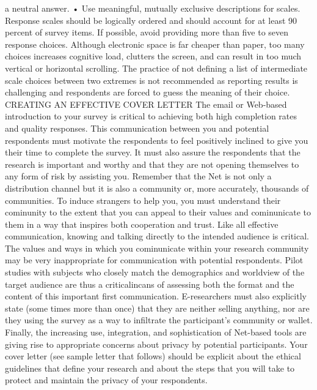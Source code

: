 \documentclass[a4 paper,12pt]{article}
\begin{document}
a neutral answer. 
• Use meaningful, mutually exclusive descriptions for scales. Response scales should be 
logically ordered and should account for at least 90 percent of survey items. If possible, avoid providing more than five to seven response choices. Although electronic space is far cheaper than paper, too many choices increases cognitive load, clutters the screen, and can result in too much vertical or horizontal scrolling. The practice of not defining a list of intermediate scale choices between two extremes is not recommended as reporting results is challenging and respondents are forced to guess the meaning of their choice. 
CREATING AN EFFECTIVE COVER LETTER 
The email or Web-based introduction to your survey is critical to achieving both high completion rates and quality responses. This communication between you and potential respondents must motivate the respondents to feel positively inclined to give you their time to complete the survey. It must also assure the respondents that the research is important and worthy and that they are not opening themselves to any form of risk by assisting you. 
Remember that the Net is not only a distribution channel but it is also a community or, more accurately, thousands of communities. To induce strangers to help you, you must understand their cominunity to the extent that you can appeal to their values and cominunicate to them in a way that inspires both cooperation and trust. Like all effective communication, knowing and talking directly to the intended audience is critical. The values and ways in which you cominunicate within your research community may be very inappropriate for communication with potential respondents. Pilot studies with subjects who closely match the demographics and worldview of the target audience are thus a criticalincans of assessing both the format and the content of this important first communication. E-researchers must also explicitly state (some times more than once) that they are neither selling anything, nor are they using the survey as a way to infiltrate the participant's community or wallet. 
Finally, the increasing use, integration, and sophistication of Net-based tools are giving rise to appropriate concerns about privacy by potential participants. Your cover letter (see sample letter that follows) should be explicit about the ethical guidelines that define your research and about the steps that you will take to protect and maintain the privacy of your respondents. 
\end{document}
